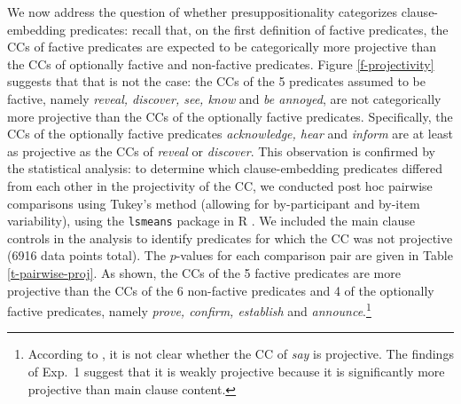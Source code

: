 \documentclass[11pt,fleqn]{article}
\newcommand{\6}{\mbox{$[\hspace*{-.6mm}[$}}
\newcommand{\9}{\mbox{$]\hspace*{-.6mm}]$}}
\begin{document}
We now address the question of whether presuppositionality categorizes clause-embedding predicates: recall that, on the first definition of factive predicates, the CCs of factive predicates are expected to be categorically more projective than the CCs of optionally factive and non-factive predicates. Figure \ref{f-projectivity} suggests that that is not the case: the CCs of the 5 predicates assumed to be factive, namely {\em reveal, discover, see, know} and {\em be annoyed}, are not categorically more projective than the CCs of the optionally factive predicates. Specifically, the CCs of the optionally factive predicates {\em acknowledge, hear} and {\em inform} are at least as projective as the CCs of {\em reveal} or {\em discover}.  This observation is confirmed by the statistical analysis: to determine which clause-embedding predicates differed from each other in the projectivity of the CC, we conducted post hoc pairwise comparisons using Tukey's method (allowing for by-participant and by-item variability), using the \verb|lsmeans| package \citep{tukey} in R \citep{r}. We included the main clause controls in the analysis to identify predicates for which the CC was not projective (6916 data points total). The $p$-values for each comparison pair are given in Table \ref{t-pairwise-proj}. As shown, the CCs of the 5 factive predicates are more projective than the CCs of the 6 non-factive predicates and 4 of the optionally factive predicates, namely {\em prove, confirm, establish} and {\em announce}.\footnote{According to \citet[1739]{spector-egre2015}, it is not clear whether the CC of {\em say} is projective. The findings of Exp.~1 suggest that it is weakly projective because it is significantly more projective than main clause content.} 
\end{document}
